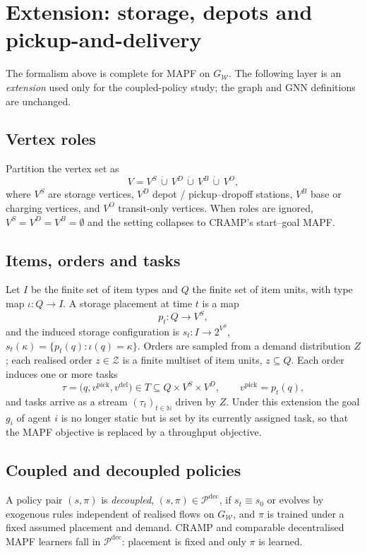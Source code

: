 \documentclass[../main.tex]{subfiles}
\begin{document}
\section{Extension: storage, depots and pickup-and-delivery}
The formalism above is complete for MAPF on $G_{\mathcal{W}}$. The following
layer is an \emph{extension} used only for the coupled-policy study; the graph
and GNN definitions are unchanged.

\subsection{Vertex roles}
Partition the vertex set as
\[
  V = V^{S} \,\dot\cup\, V^{D} \,\dot\cup\, V^{B} \,\dot\cup\, V^{O},
\]
where $V^{S}$ are storage vertices, $V^{D}$ depot / pickup--dropoff stations,
$V^{B}$ base or charging vertices, and $V^{O}$ transit-only vertices.
When roles are ignored, $V^{S} = V^{D} = V^{B} = \emptyset$ and the setting
collapses to CRAMP's start--goal MAPF.

\subsection{Items, orders and tasks}
Let $I$ be the finite set of item types and $Q$ the finite set of item units,
with type map $\iota : Q \to I$. A storage placement at time $t$ is a map
\[
  p_t : Q \to V^{S},
\]
and the induced storage configuration is
$s_t : I \to 2^{V^{S}}$, $s_t(\kappa) = \{ p_t(q) : \iota(q) = \kappa \}$.
Orders are sampled from a demand distribution $Z$; each realised order
$z \in \mathcal{Z}$ is a finite multiset of item units, $z \subseteq Q$.
Each order induces one or more tasks
\[
  \tau = \bigl( q, v^{\mathrm{pick}}, v^{\mathrm{del}} \bigr)
  \in T \subseteq Q \times V^{S} \times V^{D},
  \qquad v^{\mathrm{pick}} = p_t(q),
\]
and tasks arrive as a stream $(\tau_t)_{t \in \mathbb{N}}$ driven by $Z$.
Under this extension the goal $g_i$ of agent $i$ is no longer static but is set
by its currently assigned task, so that the MAPF objective is replaced by a
throughput objective.

\subsection{Coupled and decoupled policies}
A policy pair $(s, \pi)$ is \emph{decoupled}, $(s,\pi) \in \mathcal{P}^{\mathrm{dec}}$,
if $s_t \equiv s_0$ or evolves by exogenous rules independent of realised flows
on $G_{\mathcal{W}}$, and $\pi$ is trained under a fixed assumed
placement and demand. CRAMP and comparable decentralised MAPF learners fall in
$\mathcal{P}^{\mathrm{dec}}$: placement is fixed and only $\pi$ is learned.
\end{document}
